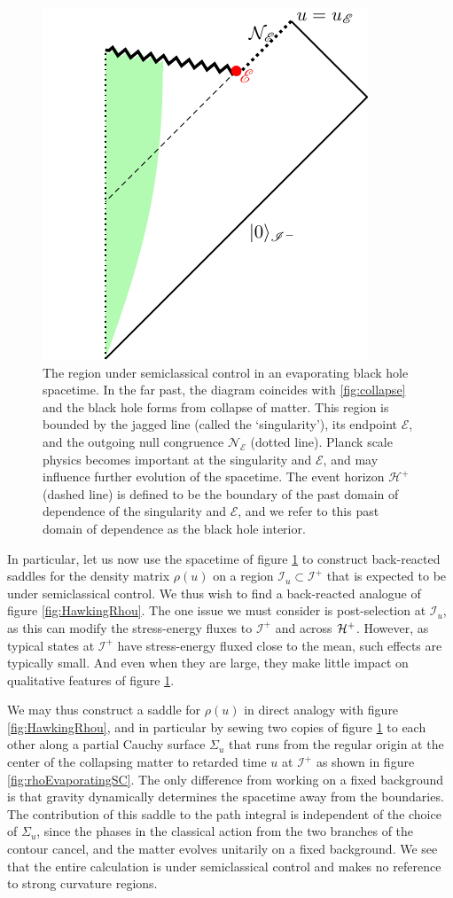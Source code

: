 \documentclass[letterpaper,12pt]{article}
\newcommand*{\scri}{\mathscr{I}} %
\newcommand*{\evap}{\mathscr{E}} %
\begin{document}
\begin{figure}
\centering
	\includegraphics[width=.35\textwidth]{Evaporate1.pdf}
\caption{The region under semiclassical control in an evaporating black hole spacetime.  In the far past, the diagram coincides with \ref{fig:collapse} and the black hole forms from collapse of matter.  This region is bounded by the jagged line (called the `singularity'), its endpoint $\evap$, and the outgoing null congruence $\mathcal{N}_\evap$ (dotted line).  Planck scale physics becomes important at the singularity and $\evap$, and may influence further evolution of the spacetime.   The event horizon $\mathcal{H}^+$ (dashed line) is defined to be the boundary of the past domain of dependence of the singularity and $\evap$, and we refer to this past domain of dependence as the black hole interior.\label{fig:EvaporatingSC}}
\end{figure}


In particular,
let us now use the spacetime of figure \ref{fig:EvaporatingSC} to construct back-reacted saddles for the density matrix $\rho(u)$ on a region $\scri_u\subset \scri^+$ that is expected to be under semiclassical control.  We thus wish to find a back-reacted analogue of figure \ref{fig:HawkingRhou}.  The one issue we must consider is post-selection at $\scri_u$, as this can modify the stress-energy fluxes to $\scri^+$ and across ${\cal H}^+$.  However, as typical states at $\scri^+$ have stress-energy fluxed close to the mean, such effects are typically small.  And even when they are large, they make little impact on qualitative features of figure \ref{fig:EvaporatingSC}.

We may thus construct a saddle for $\rho(u)$ in direct analogy with figure \ref{fig:HawkingRhou}, and in particular by sewing two copies of figure \ref{fig:EvaporatingSC} to each other along a partial Cauchy surface $\Sigma_u$ that runs from the regular origin at the center of the collapsing matter to retarded time $u$ at $\scri^+$ as shown in figure \ref{fig:rhoEvaporatingSC}.  The only difference from working on a fixed background is that gravity dynamically determines the spacetime away from the boundaries. The contribution of this saddle to the path integral is independent of the choice of $\Sigma_u$, since the phases in the classical action from the two branches of the contour cancel, and the matter evolves unitarily on a fixed background.  We see that the entire calculation is under semiclassical control and makes no reference to strong curvature regions.
\end{document}

